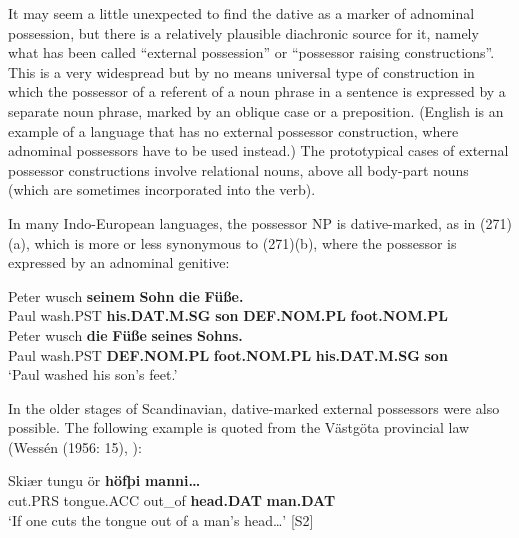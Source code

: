 
It may seem a little unexpected to find the dative as a marker of adnominal possession, but there is a relatively plausible diachronic source for it, namely what has been called “external possession” or “possessor raising constructions”. This is a very widespread but by no means universal type of construction in which the possessor of a referent of a noun phrase in a sentence is expressed by a separate noun phrase, marked by an oblique case or a preposition. (English is an example of a language that has no external possessor construction, where adnominal possessors have to be used instead.) The prototypical cases of external possessor constructions involve relational nouns, above all body-part nouns (which are sometimes incorporated into the verb).


In many Indo-European languages, the possessor NP is dative-marked, as in (271)(a), which is more or less synonymous to (271)(b), where the possessor is expressed by an adnominal genitive:


\ea\label{}
\ea 
\gll Peter  wusch  \textbf{seinem} \textbf{Sohn} \textbf{die} \textbf{Füße.}\\
Paul  wash.PST  \textbf{his.DAT.M.SG} \textbf{son} \textbf{DEF.NOM.PL} \textbf{foot.NOM.PL}\\
\ex 
\gll Peter  wusch  \textbf{die} \textbf{Füße} \textbf{seines} \textbf{Sohns.}\\
Paul  wash.PST  \textbf{DEF.NOM.PL} \textbf{foot.NOM.PL} \textbf{his.DAT.M.SG} \textbf{son}\\
\glt ‘Paul washed his son’s feet.’
\z
\z 

In the older stages of Scandinavian, dative-marked external possessors were also possible. The following example is quoted from the Västgöta provincial law (Wessén (1956: 15), \citet[212]{Norde1997}): 


\ea\label{}
\gll Skiær  tungu  ör  \textbf{höfþi} \textbf{manni…}\\
cut.PRS  tongue.ACC  out\_of  \textbf{head.DAT} \textbf{man.DAT}\\
\glt ‘If one cuts the tongue out of a man’s head…’ [S2]
\z

